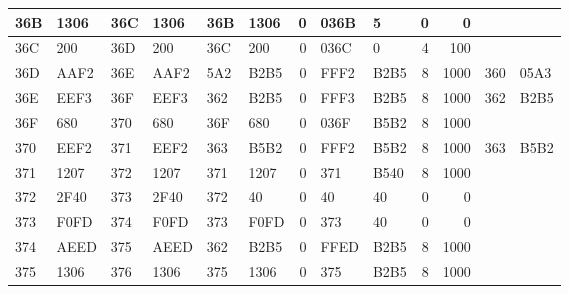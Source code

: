 \begin{center}
\begin{tabular}{|l|l|l|l|l|l|r|l|l|r|r|l|l|}
        \hline
        36B          & 1306          & 36C         & 1306        & 36B         & 1306        & 0           & 036B        & 5           & 0           & 0             &              &               \\
        \hline
        36C          & 200           & 36D         & 200         & 36C         & 200         & 0           & 036C        & 0           & 4           & 100           &              &               \\
        \hline
        36D          & AAF2          & 36E         & AAF2        & 5A2         & B2B5        & 0           & FFF2        & B2B5        & 8           & 1000          & 360          & 05A3          \\
        \hline
        36E          & EEF3          & 36F         & EEF3        & 362         & B2B5        & 0           & FFF3        & B2B5        & 8           & 1000          & 362          & B2B5          \\
        \hline
        36F          & 680           & 370         & 680         & 36F         & 680         & 0           & 036F        & B5B2        & 8           & 1000          &              &               \\
        \hline
        370          & EEF2          & 371         & EEF2        & 363         & B5B2        & 0           & FFF2        & B5B2        & 8           & 1000          & 363          & B5B2          \\
        \hline
        371          & 1207          & 372         & 1207        & 371         & 1207        & 0           & 371         & B540        & 8           & 1000          &              &               \\
        \hline
        372          & 2F40          & 373         & 2F40        & 372         & 40          & 0           & 40          & 40          & 0           & 0             &              &               \\
        \hline
        373          & F0FD          & 374         & F0FD        & 373         & F0FD        & 0           & 373         & 40          & 0           & 0             &              &               \\
        \hline
        374          & AEED          & 375         & AEED        & 362         & B2B5        & 0           & FFED        & B2B5        & 8           & 1000          &              &               \\
        \hline
        375          & 1306          & 376         & 1306        & 375         & 1306        & 0           & 375         & B2B5        & 8           & 1000          &              &               \\

\end{tabular}
\end{center}
